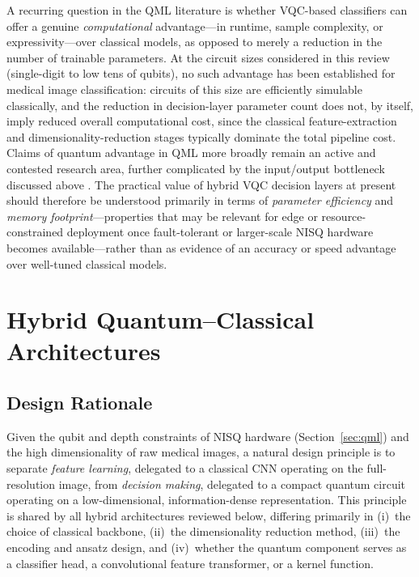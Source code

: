 \documentclass[11pt,a4paper]{article}
\begin{document}
A recurring question in the QML literature is whether VQC-based classifiers
can offer a genuine \emph{computational} advantage---in runtime, sample
complexity, or expressivity---over classical models, as opposed to merely a
reduction in the number of trainable parameters.  At the circuit sizes
considered in this review (single-digit to low tens of qubits), no such
advantage has been established for medical image classification: circuits of
this size are efficiently simulable classically, and the reduction in
decision-layer parameter count does not, by itself, imply reduced overall
computational cost, since the classical feature-extraction and
dimensionality-reduction stages typically dominate the total pipeline cost.
Claims of quantum advantage in QML more broadly remain an active and contested
research area, further complicated by the input/output bottleneck discussed
above \cite{aaronson2015,biamonte2017}.  The practical value of hybrid VQC
decision layers at present should therefore be understood primarily in terms
of \emph{parameter efficiency} and \emph{memory footprint}---properties that
may be relevant for edge or resource-constrained deployment once fault-tolerant
or larger-scale NISQ hardware becomes available---rather than as evidence of
an accuracy or speed advantage over well-tuned classical models.

\section{Hybrid Quantum--Classical Architectures}
\label{sec:hybrid}

\subsection{Design Rationale}

Given the qubit and depth constraints of NISQ hardware
(Section~\ref{sec:qml}) and the high dimensionality of raw medical images, a
natural design principle is to separate \emph{feature learning}, delegated to
a classical CNN operating on the full-resolution image, from \emph{decision
making}, delegated to a compact quantum circuit operating on a low-dimensional,
information-dense representation.  This principle is shared by all hybrid
architectures reviewed below, differing primarily in (i)~the choice of
classical backbone, (ii)~the dimensionality reduction method, (iii)~the
encoding and ansatz design, and (iv)~whether the quantum component serves as a
classifier head, a convolutional feature transformer, or a kernel function.
\end{document}
